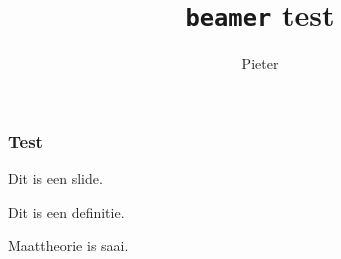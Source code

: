 \documentclass{beamer}
\title{\texttt{beamer} test}
\author{Pieter}
\begin{document}
\begin{frame}
  \titlepage
\end{frame}

\begin{frame}
  \frametitle{Test}

  Dit is een slide.

  \begin{definition}
    Dit is een definitie.
  \end{definition}

  \begin{lemma}
    Maattheorie is saai.
  \end{lemma}
\end{frame}
\end{document}

